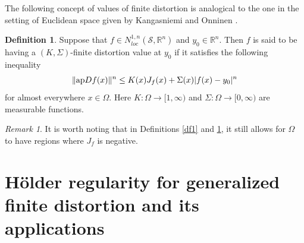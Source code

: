 \documentclass[11pt,twoside]{article}
\theoremstyle{definition}
\newtheorem{defn}{Definition}[section]
\theoremstyle{remark}
\newtheorem*{rem}{Remark}
\begin{document}
 The following concept of values of finite distortion is analogical to the one in the setting of Euclidean space given  by Kangasniemi and Onninen \cite{KO25}.
\begin{defn}\label{df2}
Suppose that $f\in N_{loc}^{1,n}(\mathcal{S},\mathbb{R}^{n})$ and $y_{0}\in\mathbb{R}^{n}.$  Then $f$ is said to be having a $(K, \Sigma)$-finite distortion value at $y_{0}$ if it satisfies the following inequality
\begin{equation}\label{df2111111}
\| {\rm ap}Df(x)\|^{n}\leq K(x)J_{f}(x)+\Sigma(x)\vert f(x)-y_{0}\vert^{n}
\end{equation}
for almost everywhere $x\in\Omega.$ Here $K:\Omega\rightarrow[1,\infty)$ and $\Sigma:\Omega\rightarrow[0,\infty)$ are  measurable functions.
\end{defn}

\begin{rem} 
It is worth noting that in Definitions \ref{df1} and \ref{df2}, it still allows for $\Omega$ to have regions where $J_{f}$  is negative.
\end{rem}
































  
 
 
 
 
 
 
 
 
 \section{H\"{o}lder regularity for generalized finite distortion and its applications}\label{sec255555}
\end{document}
